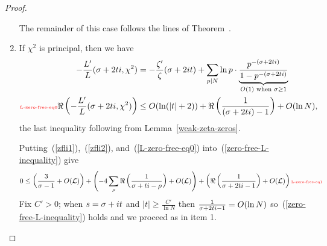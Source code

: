 \begin{proof}
\begin{enumerate}
The remainder of this case follows the lines of Theorem~.
\item
If $\chi^2$ is principal, then we have
\begin{align}\nonumber
-\frac{L'}{L}(\si+2ti,\chi^2)&=-\frac{\ze'}{\ze}(\si+2it)+\sum_{p\mid N} 
\ln p\cdot \underbrace{\frac{p^{-(\si+2ti)}}{1-p^{-(\si+2ti)}}}_{O(1)\text{ when }\si\ge 1}\\
\llabel{L-zero-free-eq0}
\Re\pa{-\fc{L'}{L}(\si+2ti,\chi^2)}
&\le O(\ln (|t|+2))+\Re\prc{(\si+2ti)-1}+O(\ln N),
\end{align}
the last inequality following from Lemma~\ref{weak-zeta-zeros}.

Putting~(\ref{zfli1}),~(\ref{zfli2}), and~(\ref{L-zero-free-eq0}) into~(\ref{zero-free-L-inequality}) give
\begin{equation}
0\le \pa{\fc{3}{\si-1} +O(\cal L)}+\pa{-4\sum_{\rh} \Re\prc{\si+ti-\rh}+O(\cal L)}+\pa{\Re\prc{\si+2ti-1}+O(\cal L)}\llabel{L-zero-free-eq1}
\end{equation}
Fix $C'>0$; when $s=\sigma+it$ and $|t|\ge \frac{C'}{\ln N}$ then $\frac{1}{\sigma+2ti-1}=O(\ln N)$ so~(\ref{zero-free-L-inequality}) holds and we proceed as in item 1.


\end{enumerate}
\end{proof}
